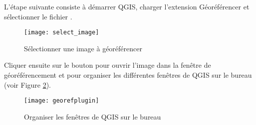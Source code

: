 L'\'etape suivante consiste \`a d\'emarrer QGIS, charger l'extension G\'eor\'ef\'erencer et s\'electionner le fichier .


\begin{figure}[ht]
\begin{center}
\caption{S\'electionner une image \`a g\'eor\'ef\'erencer \nixcaption}\label{fig:select_image}\smallskip
  \texttt{[image: select\_image]}
\end{center}
\end{figure}


Cliquer ensuite sur le bouton  pour ouvrir l'image dans
la fen\^etre de g\'eor\'ef\'erencement et pour organiser les diff\'erentes fen\^etres de QGIS sur
le bureau (voir Figure \ref{fig:georefplugin}).


\begin{figure}[ht]
\begin{center}
  \caption{Organiser les fen\^etres de QGIS sur le bureau \nixcaption}\label{fig:georefplugin}\smallskip
  \texttt{[image: georefplugin]}
\end{center}
\end{figure}


